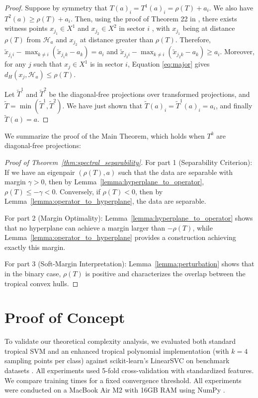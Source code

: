 \documentclass{article}
\renewcommand{\leq}{\leqslant}
\begin{document}
\begin{proof}
Suppose by symmetry that $T(a)_{i}=T^{1}(a)_{i}=\rho(T)+a_{i}$. We
also have $T^{2}(a)\ge\rho(T)+a_{i}$. Then, using the proof of Theorem
22 in \cite{akian2020}, there exists witness points $x_{j_{1}}\in X^{1}$ and
$x_{j_{2}}\in X^{2}$ in sector $i$ , with $x_{j_{1}}$ being at
distance $\rho(T)$ from $\mathcal{H}_{a}$ and $x_{j_{2}}$ at distance
greater than $\rho(T)$. Therefore, $\tilde{x}_{j_{1}i}-\max_{k\ne i}(\tilde{x}_{j_{1}k}-a_{k})=a_{i}$
and $\tilde{x}_{j_{2}i}-\max_{k\ne i}(\tilde{x}_{j_{2}k}-a_{k})\ge a_{i}$.
Moreover, for any $j$ such that $x_{j}\in X^1$ is in sector $i$,
Equation \ref{eq:major} gives $d_{H}(x_{j},\mathcal{H}_{a})\le\rho(T)$.

Let $\tilde{T}^{1}$ and $\tilde{T}^{2}$ be the diagonal-free projections
over transformed projections, and $\tilde{T}=\min(\tilde{T}^{1},\tilde{T}^{2})$.
We have just shown that $\tilde{T}(a)_{i}=\tilde{T}^{1}(a)_{i}=a_{i}$,
and finally $\tilde{T}(a)=a$.
\end{proof}

We summarize the proof of the Main Theorem, which holds when $T^k$ are diagonal-free projections:

\begin{proof}[Proof of Theorem~\ref{thm:spectral_separability}]
For part 1 (Separability Criterion): If we have an eigenpair $(\rho(T),a)$ such that the data are separable with margin $\gamma > 0$, then by Lemma~\ref{lemma:hyperplane_to_operator}, $\rho(T) \leq -\gamma < 0$. Conversely, if $\rho(T) < 0$, then by Lemma~\ref{lemma:operator_to_hyperplane}, the data are separable.

For part 2 (Margin Optimality): Lemma~\ref{lemma:hyperplane_to_operator} shows that no hyperplane can achieve a margin larger than $-\rho(T)$, while Lemma~\ref{lemma:operator_to_hyperplane} provides a construction achieving exactly this margin.

For part 3 (Soft-Margin Interpretation): Lemma~\ref{lemma:perturbation} shows that in the binary case, $\rho(T)$ is positive and characterizes the overlap between the tropical convex hulls.
\end{proof}

\section{Proof of Concept}\label{appendix:empirical}

To validate our theoretical complexity analysis, we evaluated both standard tropical SVM and an enhanced tropical polynomial implementation (with $k=4$ sampling points per class) against scikit-learn's LinearSVC on benchmark datasets \cite{scikit-learn}. All experiments used 5-fold cross-validation with standardized features. We compare training times for a fixed convergence threshold. All experiments were conducted on a MacBook Air M2 with 16GB RAM using NumPy \cite{harris2020array}.
\end{document}
